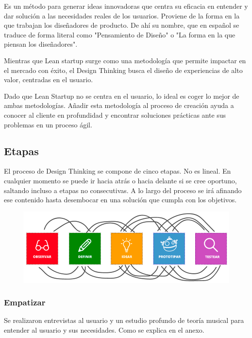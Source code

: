 \documentclass[12pt,twoside,titlepage]{report}
\begin{document}
Es un método para generar ideas innovadoras que centra su eficacia en entender y dar solución a las necesidades reales de los usuarios. Proviene de la forma en la que trabajan los diseñadores de producto. De ahí su nombre, que en español se traduce de forma literal como "Pensamiento de Diseño" o "La forma en la que piensan los diseñadores".

Mientras que Lean startup surge como una metodología que permite impactar en el mercado con éxito, el Design Thinking busca el diseño de experiencias de alto valor, centradas en el usuario.

Dado que Lean Startup no se centra en el usuario, lo ideal es coger lo mejor de ambas metodologías. Añadir esta metodología al proceso de creación ayuda a conocer al cliente en profundidad y encontrar soluciones prácticas ante sus problemas en un proceso ágil.

\subsection{Etapas}

El proceso de Design Thinking se compone de cinco etapas. No es lineal. En cualquier momento se puede ir hacia atrás o hacia delante si se cree oportuno, saltando incluso a etapas no consecutivas. A lo largo del proceso se irá afinando ese contenido hasta desembocar en una solución que cumpla con los objetivos. 

\begin{figure}[H] 
    \includegraphics[scale=0.44]{Design Thinking/Etapas}
    \centering
    \label{fig:Design Thinking}
\end{figure}

\subsubsection{Empatizar}

Se realizaron entrevistas al usuario y un estudio profundo de teoría musical para entender al usuario y sus necesidades. Como se explica en el anexo.
\end{document}
